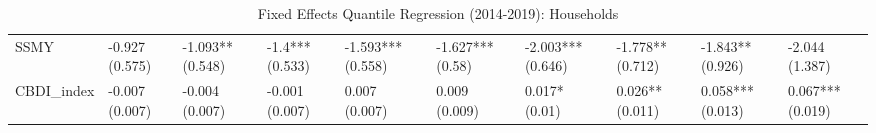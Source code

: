 \begin{table}[H]
\begin{adjustbox}{totalheight=2.5in, width=\columnwidth }
\begin{subtable}[c]{1.1\textwidth}
{\begin{tabular}{llllllllll}
  SSMY & -0.927 (0.575) & -1.093** (0.548) & -1.4*** (0.533) & -1.593*** (0.558) & -1.627*** (0.58) & -2.003*** (0.646) & -1.778** (0.712) & -1.843** (0.926) & -2.044 (1.387) \\ 
  CBDI\_index & -0.007 (0.007) & -0.004 (0.007) & -0.001 (0.007) & 0.007 (0.007) & 0.009 (0.009) & 0.017* (0.01) & 0.026** (0.011) & 0.058*** (0.013) & 0.067*** (0.019) \\ 
   \bottomrule
\end{tabular}}
\end{subtable}
\end{adjustbox}
\caption{Fixed Effects Quantile Regression (2014-2019): Households} 
\label{qrfe_npl_hh}
\end{table}
